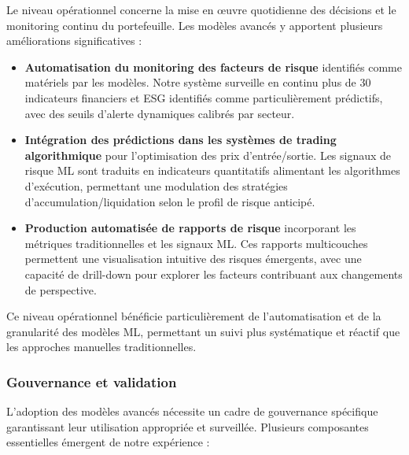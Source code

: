 Le niveau opérationnel concerne la mise en œuvre quotidienne des décisions et le monitoring continu du portefeuille. Les modèles avancés y apportent plusieurs améliorations significatives :

\begin{itemize}
    \item \textbf{Automatisation du monitoring des facteurs de risque} identifiés comme matériels par les modèles. Notre système surveille en continu plus de 30 indicateurs financiers et ESG identifiés comme particulièrement prédictifs, avec des seuils d'alerte dynamiques calibrés par secteur.
    
    \item \textbf{Intégration des prédictions dans les systèmes de trading algorithmique} pour l'optimisation des prix d'entrée/sortie. Les signaux de risque ML sont traduits en indicateurs quantitatifs alimentant les algorithmes d'exécution, permettant une modulation des stratégies d'accumulation/liquidation selon le profil de risque anticipé.
    
    \item \textbf{Production automatisée de rapports de risque} incorporant les métriques traditionnelles et les signaux ML. Ces rapports multicouches permettent une visualisation intuitive des risques émergents, avec une capacité de drill-down pour explorer les facteurs contribuant aux changements de perspective.
\end{itemize}

Ce niveau opérationnel bénéficie particulièrement de l'automatisation et de la granularité des modèles ML, permettant un suivi plus systématique et réactif que les approches manuelles traditionnelles.

\subsubsection{Gouvernance et validation}

L'adoption des modèles avancés nécessite un cadre de gouvernance spécifique garantissant leur utilisation appropriée et surveillée. Plusieurs composantes essentielles émergent de notre expérience :


